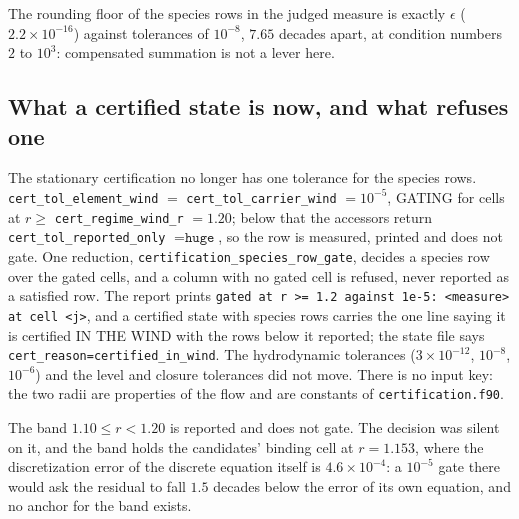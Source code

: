 \documentclass[english,a4paper]{my_memo}
\newcommand{\code}[1]{\texttt{#1}}
\begin{document}
\noindent The rounding floor of the species rows in the judged measure is
exactly $\epsilon$ ($2.2\times10^{-16}$) against tolerances of $10^{-8}$,
$7.65$ decades apart, at condition numbers $2$ to $10^{3}$: compensated
summation is not a lever here.

\subsection{What a certified state is now, and what refuses one}
\label{sec:certtol}

The stationary certification no longer has one tolerance for the species
rows. \code{cert\_tol\_element\_wind} $=$ \code{cert\_tol\_carrier\_wind}
$= 10^{-5}$, GATING for cells at $r \ge$ \code{cert\_regime\_wind\_r}
$= 1.20$; below that the accessors return
\code{cert\_tol\_reported\_only} $= \code{huge}$, so the row is measured,
printed and does not gate. One reduction,
\code{certification\_species\_row\_gate}, decides a species row over the
gated cells, and a column with no gated cell is refused, never reported as a
satisfied row. The report prints \code{gated at r >= 1.2 against 1e-5:
<measure> at cell <j>}, and a certified state with species rows carries the
one line saying it is certified IN THE WIND with the rows below it reported;
the state file says \code{cert\_reason=certified\_in\_wind}. The
hydrodynamic tolerances ($3\times10^{-12}$, $10^{-8}$, $10^{-6}$) and the
level and closure tolerances did not move. There is no input key: the two
radii are properties of the flow and are constants of
\code{certification.f90}.

The band $1.10 \le r < 1.20$ is reported and does not gate. The decision was
silent on it, and the band holds the candidates' binding cell at $r = 1.153$,
where the discretization error of the discrete equation itself is
$4.6\times10^{-4}$: a $10^{-5}$ gate there would ask the residual to fall
$1.5$ decades below the error of its own equation, and no anchor for the band
exists.
\end{document}
